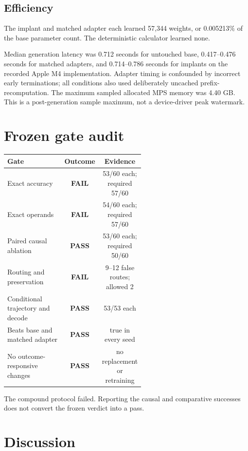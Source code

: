 \documentclass[11pt]{article}
\newcommand{\pass}{\textcolor{passgreen}{\textbf{PASS}}}
\newcommand{\fail}{\textcolor{failred}{\textbf{FAIL}}}
\begin{document}
\subsection{Efficiency}

The implant and matched adapter each learned 57,344 weights, or 0.005213\% of
the base parameter count. The deterministic calculator learned none.

Median generation latency was 0.712 seconds for untouched base, 0.417--0.476
seconds for matched adapters, and 0.714--0.786 seconds for implants on the
recorded Apple M4 implementation. Adapter timing is confounded by incorrect
early terminations; all conditions also used deliberately uncached
prefix-recomputation. The maximum sampled allocated MPS memory was 4.40 GB.
This is a post-generation sample maximum, not a device-driver peak watermark.

\section{Frozen gate audit}

\begin{center}
\small
\begin{tabular}{p{0.56\linewidth}cc}
\toprule
Gate & Outcome & Evidence\\
\midrule
Exact accuracy & \fail & 53/60 each; required 57/60\\
Exact operands & \fail & 54/60 each; required 57/60\\
Paired causal ablation & \pass & 53/60 each; required 50/60\\
Routing and preservation & \fail & 9--12 false routes; allowed 2\\
Conditional trajectory and decode & \pass & 53/53 each\\
Beats base and matched adapter & \pass & true in every seed\\
No outcome-responsive changes & \pass & no replacement or retraining\\
\bottomrule
\end{tabular}
\end{center}

The compound protocol failed. Reporting the causal and comparative successes
does not convert the frozen verdict into a pass.

\section{Discussion}
\end{document}
